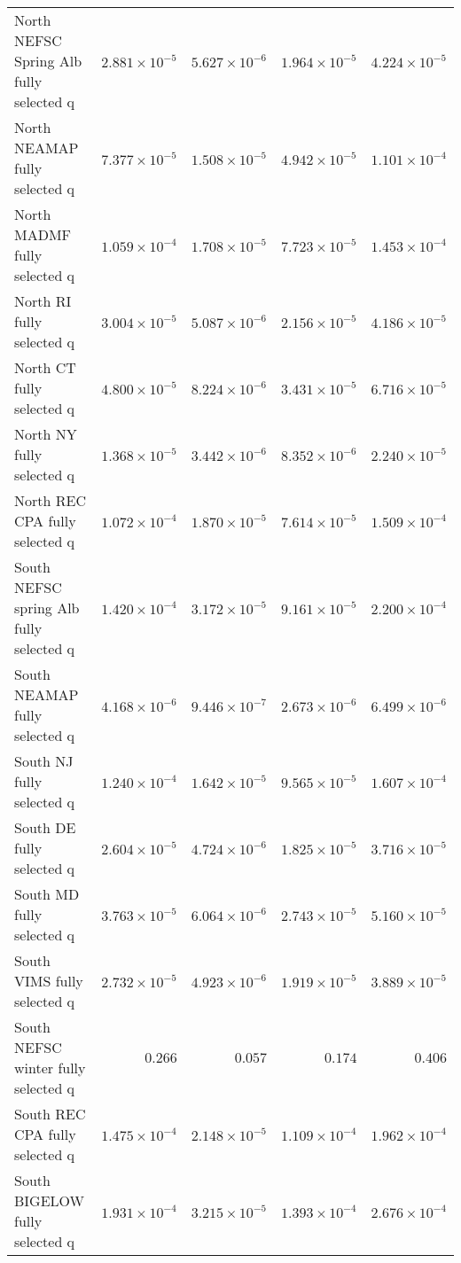 \documentclass[
]{article}
\begin{document}
\begin{landscape}
\begin{longtable}[t]{lrrrr}
\addlinespace
North NEFSC Spring Alb fully selected q & $2.881\times 10^{-5}$ & $5.627\times 10^{-6}$ & $1.964\times 10^{-5}$ & $4.224\times 10^{-5}$\\
North NEAMAP fully selected q & $7.377\times 10^{-5}$ & $1.508\times 10^{-5}$ & $4.942\times 10^{-5}$ & $1.101\times 10^{-4}$\\
North MADMF fully selected q & $1.059\times 10^{-4}$ & $1.708\times 10^{-5}$ & $7.723\times 10^{-5}$ & $1.453\times 10^{-4}$\\
North RI fully selected q & $3.004\times 10^{-5}$ & $5.087\times 10^{-6}$ & $2.156\times 10^{-5}$ & $4.186\times 10^{-5}$\\
North CT fully selected q & $4.800\times 10^{-5}$ & $8.224\times 10^{-6}$ & $3.431\times 10^{-5}$ & $6.716\times 10^{-5}$\\
\addlinespace
North NY fully selected q & $1.368\times 10^{-5}$ & $3.442\times 10^{-6}$ & $8.352\times 10^{-6}$ & $2.240\times 10^{-5}$\\
North REC CPA fully selected q & $1.072\times 10^{-4}$ & $1.870\times 10^{-5}$ & $7.614\times 10^{-5}$ & $1.509\times 10^{-4}$\\
South NEFSC spring Alb fully selected q & $1.420\times 10^{-4}$ & $3.172\times 10^{-5}$ & $9.161\times 10^{-5}$ & $2.200\times 10^{-4}$\\
South NEAMAP fully selected q & $4.168\times 10^{-6}$ & $9.446\times 10^{-7}$ & $2.673\times 10^{-6}$ & $6.499\times 10^{-6}$\\
South NJ fully selected q & $1.240\times 10^{-4}$ & $1.642\times 10^{-5}$ & $9.565\times 10^{-5}$ & $1.607\times 10^{-4}$\\
\addlinespace
South DE fully selected q & $2.604\times 10^{-5}$ & $4.724\times 10^{-6}$ & $1.825\times 10^{-5}$ & $3.716\times 10^{-5}$\\
South MD fully selected q & $3.763\times 10^{-5}$ & $6.064\times 10^{-6}$ & $2.743\times 10^{-5}$ & $5.160\times 10^{-5}$\\
South VIMS fully selected q & $2.732\times 10^{-5}$ & $4.923\times 10^{-6}$ & $1.919\times 10^{-5}$ & $3.889\times 10^{-5}$\\
South NEFSC winter fully selected q & $0.266$ & $0.057$ & $0.174$ & $0.406$\\
South REC CPA fully selected q & $1.475\times 10^{-4}$ & $2.148\times 10^{-5}$ & $1.109\times 10^{-4}$ & $1.962\times 10^{-4}$\\
\addlinespace
South BIGELOW fully selected q & $1.931\times 10^{-4}$ & $3.215\times 10^{-5}$ & $1.393\times 10^{-4}$ & $2.676\times 10^{-4}$\\

\end{longtable}
\end{landscape}
\end{document}
